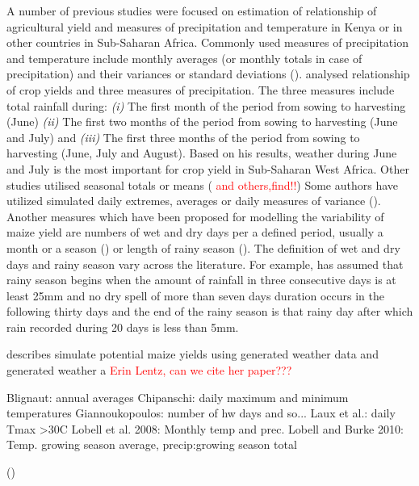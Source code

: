 \documentclass[a4paper,12pt]{article}
\begin{document}
 
A number of previous studies were focused on estimation of relationship of agricultural yield and measures of precipitation and temperature in Kenya or in other countries in Sub-Saharan Africa. Commonly used measures of precipitation and temperature include monthly averages (or monthly totals in case of precipitation) and their variances or standard deviations (\citealt{AbrahaSavage2006, LobellEtAl2008, ThorntonEtAl2009}). \cite{Adejuwon2004} analysed relationship of crop yields and three measures of precipitation. The three measures include total rainfall during: \textit{(i)} The first month of the period from sowing to harvesting (June) \textit{(ii)} The first two months of the period from sowing to harvesting (June and July) and \textit{(iii)} The first three months of the period from sowing to harvesting (June, July and August). Based on his results, weather during June and July is the most important for crop yield in Sub-Saharan West Africa. Other studies utilised seasonal totals or means (\citealt{sagoe2006,LobellBurke2010} \textcolor{red}{and others,find!!})  Some authors have utilized simulated daily extremes, averages or daily measures of variance  (\citealt{SchulzeEtA1993,Chipanshi2003,AbrahaSavage2006}). Another measures which have been proposed for modelling the variability of maize yield are numbers of wet and dry days per a defined period, usually a month or a season (\citealt{BenMohamed2002,AbrahaSavage2006,sagoe2006,Giannakopoulos2009})   or length of rainy season (\citealt{Leemans1993,BenMohamed2002}). The definition of wet and dry days and rainy season vary across the literature. For example, \citep{BenMohamed2002} has assumed that rainy season begins when the amount of rainfall in three consecutive days is at least 25mm and no dry spell of more than seven days duration occurs in the following thirty days and the end of the rainy season is that rainy day after which rain recorded during 20 days is less than 5mm.


 describes simulate potential maize yields using generated weather data and generated weather a
\textcolor{red}{Erin Lentz, can we cite her paper???}


Blignaut: annual averages
Chipanschi: daily maximum and minimum temperatures
Giannoukopoulos: number of hw days and so...
Laux et al.: daily Tmax >30C
Lobell et al. 2008: Monthly temp and prec.
Lobell and Burke 2010: Temp. growing season average, precip:growing season total

(\citealt{AbrahaSavage2006,Adejuwon2004,BenMohamed2002,BLIGNAUT2009,
Chipanshi2003,Giannakopoulos2009,LauxEtAl,Leemans1993,LobellEtAl2008,
LobellBurke2010,sagoe2006,SchulzeEtA1993,ThorntonEtAl2009,TingemEtAl2008,
TingemEtAl2009,WalkerSchulze2008})
\end{document}
